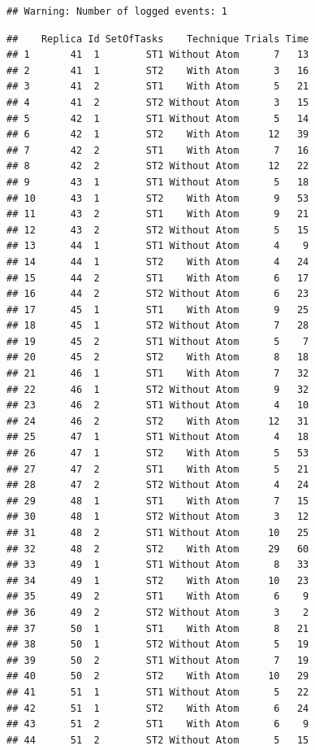 \documentclass[]{article}
\begin{document}
\begin{verbatim}
## Warning: Number of logged events: 1
\end{verbatim}

\begin{verbatim}
##    Replica Id SetOfTasks    Technique Trials Time
## 1       41  1        ST1 Without Atom      7   13
## 2       41  1        ST2    With Atom      3   16
## 3       41  2        ST1    With Atom      5   21
## 4       41  2        ST2 Without Atom      3   15
## 5       42  1        ST1 Without Atom      5   14
## 6       42  1        ST2    With Atom     12   39
## 7       42  2        ST1    With Atom      7   16
## 8       42  2        ST2 Without Atom     12   22
## 9       43  1        ST1 Without Atom      5   18
## 10      43  1        ST2    With Atom      9   53
## 11      43  2        ST1    With Atom      9   21
## 12      43  2        ST2 Without Atom      5   15
## 13      44  1        ST1 Without Atom      4    9
## 14      44  1        ST2    With Atom      4   24
## 15      44  2        ST1    With Atom      6   17
## 16      44  2        ST2 Without Atom      6   23
## 17      45  1        ST1    With Atom      9   25
## 18      45  1        ST2 Without Atom      7   28
## 19      45  2        ST1 Without Atom      5    7
## 20      45  2        ST2    With Atom      8   18
## 21      46  1        ST1    With Atom      7   32
## 22      46  1        ST2 Without Atom      9   32
## 23      46  2        ST1 Without Atom      4   10
## 24      46  2        ST2    With Atom     12   31
## 25      47  1        ST1 Without Atom      4   18
## 26      47  1        ST2    With Atom      5   53
## 27      47  2        ST1    With Atom      5   21
## 28      47  2        ST2 Without Atom      4   24
## 29      48  1        ST1    With Atom      7   15
## 30      48  1        ST2 Without Atom      3   12
## 31      48  2        ST1 Without Atom     10   25
## 32      48  2        ST2    With Atom     29   60
## 33      49  1        ST1 Without Atom      8   33
## 34      49  1        ST2    With Atom     10   23
## 35      49  2        ST1    With Atom      6    9
## 36      49  2        ST2 Without Atom      3    2
## 37      50  1        ST1    With Atom      8   21
## 38      50  1        ST2 Without Atom      5   19
## 39      50  2        ST1 Without Atom      7   19
## 40      50  2        ST2    With Atom     10   29
## 41      51  1        ST1 Without Atom      5   22
## 42      51  1        ST2    With Atom      6   24
## 43      51  2        ST1    With Atom      6    9
## 44      51  2        ST2 Without Atom      5   15

\end{verbatim}
\end{document}
